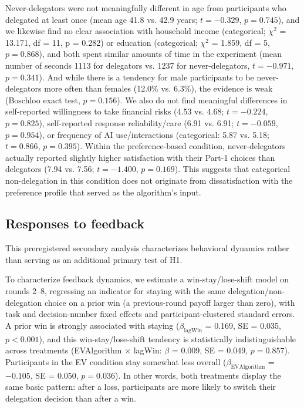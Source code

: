 \documentclass[a4paper, 12pt, fleqn]{article}
\theoremstyle{definition}
\begin{document}
Never-delegators were not meaningfully different in age from participants who delegated at least once (mean age 41.8 vs. 42.9 years; $t = -0.329$, $p = 0.745$), and we likewise find no clear association with household income (categorical; \(\chi^2\) = 13.171, df = 11, p = 0.282) or education (categorical; \(\chi^2\) = 1.859, df = 5, $p = 0.868$), and both spent similar amounts of time in the experiment (mean number of seconds 1113 for delegators vs. 1237 for never-delegators, $t = -0.971$, $p = 0.341$). And while there is a tendency for male participants to be never-delegators more often than females (12.0\% vs. 6.3\%), the evidence is weak (Boschloo exact test, $p = 0.156$). We also do not find meaningful differences in self-reported willingness to take financial risks (4.53 vs. 4.68; $t = -0.224$, $p = 0.825$), self-reported response reliability/care (6.91 vs. 6.91; $t = -0.059$, $p = 0.954$), or frequency of AI use/interactions (categorical: 5.87 vs. 5.18; $t = 0.866$, $p = 0.395$).
Within the preference-based condition, never-delegators actually reported slightly higher satisfaction with their Part-1 choices than delegators (7.94 vs. 7.56; $t = -1.400$, $p = 0.169$). This suggests that categorical non-delegation in this condition does not originate from dissatisfaction with the preference profile that served as the algorithm's input.


\subsection{Responses to feedback}
This preregistered secondary analysis characterizes behavioral dynamics rather than serving as an additional primary test of H1.

To characterize feedback dynamics, we estimate a win-stay/lose-shift model on rounds 2--8, regressing an indicator for staying with the same delegation/non-delegation choice on a prior win (a previous-round payoff larger than zero), with task and decision-number fixed effects and participant-clustered standard errors. A prior win is strongly associated with staying ($\beta_{\text{lagWin}}$ = 0.169, SE = 0.035, $p < 0.001$), and this win-stay/lose-shift tendency is statistically indistinguishable across treatments (EVAlgorithm $\times$ lagWin: $\beta$ = 0.009, SE = 0.049, $p = 0.857$). Participants in the EV condition stay somewhat less overall ($\beta_{\text{EVAlgorithm}}$ = $-0.105$, SE = 0.050, $p = 0.036$). In other words, both treatments display the same basic pattern: after a loss, participants are more likely to switch their delegation decision than after a win.
\end{document}
